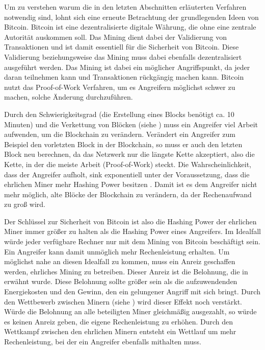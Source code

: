 \documentclass[ngerman,runningheads,a4paper]{llncs}[2018/03/10]
\begin{document}
Um zu verstehen warum die in den letzten Abschnitten erläuterten Verfahren notwendig sind, lohnt sich eine erneute Betrachtung der grundlegenden Ideen von Bitcoin. Bitcoin ist eine dezentralisierte digitale Währung, die ohne eine zentrale Autorität auskommen soll. Das Mining dient dabei der Validierung von Transaktionen und ist damit essentiell für die Sicherheit von Bitcoin. Diese Validierung beziehungsweise das Mining muss dabei ebenfalls dezentralisiert ausgeführt werden. Das Mining ist dabei ein möglicher Angriffspunkt, da jeder daran teilnehmen kann und Transaktionen rückgängig machen kann. Bitcoin nutzt das Proof-of-Work Verfahren, um es Angreifern möglichst schwer zu machen, solche Änderung durchzuführen.

Durch den Schwierigkeitsgrad (die Erstellung eines Blocks benötigt ca. 10 Minuten) und die Verkettung von Blöcken (siehe ) muss ein Angreifer viel Arbeit aufwenden, um die Blockchain zu verändern. Verändert ein Angreifer zum Beispiel den vorletzten Block in der Blockchain, so muss er auch den letzten Block neu berechnen, da das Netzwerk nur die längste Kette akzeptiert, also die Kette, in der die meiste Arbeit (Proof-of-Work) steckt. Die Wahrscheinlichkeit, dass der Angreifer aufholt, sink exponentiell unter der Voraussetzung, dass die ehrlichen Miner mehr Hashing Power besitzen \citep{bitcoinPDF}. Damit ist es dem Angreifer nicht mehr möglich, alte Blöcke der Blockchain zu verändern, da der Rechenaufwand zu groß wird.

Der Schlüssel zur Sicherheit von Bitcoin ist also die Hashing Power der ehrlichen Miner immer größer zu halten als die Hashing Power eines Angreifers. Im Idealfall würde jeder verfügbare Rechner nur mit dem Mining von Bitcoin beschäftigt sein. Ein Angreifer kann damit unmöglich mehr Rechenleistung erhalten. Um möglichst nahe an diesen Idealfall zu kommen, muss ein Anreiz geschaffen werden, ehrliches Mining zu betreiben. Dieser Anreiz ist die Belohnung, die in  erwähnt wurde. Diese Belohnung sollte größer sein als die aufzuwendenden Energiekosten und den Gewinn, den ein gelungener Angriff mit sich bringt. Durch den Wettbewerb zwischen Minern (siehe ) wird dieser Effekt noch verstärkt. Würde die Belohnung an alle beteiligten Miner gleichmäßig ausgezahlt, so würde es keinen Anreiz geben, die eigene Rechenleistung zu erhöhen. Durch den Wettkampf zwischen den ehrlichen Minern entsteht ein Wettlauf um mehr Rechenleistung, bei der ein Angreifer ebenfalls mithalten muss.
\end{document}
